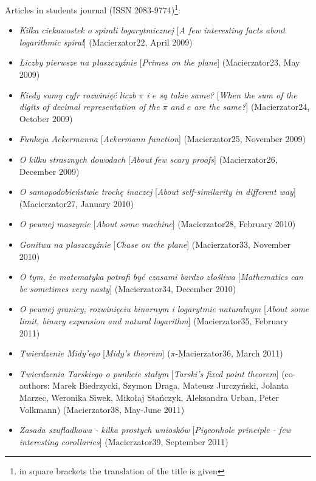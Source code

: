 \noindent Articles in students journal \macierzator (ISSN 2083-9774)\footnote{in square brackets the translation of the title is given}:
\begin{itemize}
  \item \textsl{Kilka ciekawostek o spirali logarytmicznej} [\textsl{A few interesting facts about logarithmic spiral}] (Macierzator22, April 2009)
  \item \textsl{Liczby pierwsze na płaszczyźnie} [\textsl{Primes on the plane}] (Macierzator23, May 2009)
  \item \textsl{Kiedy sumy cyfr rozwinięć liczb $\pi$ i $e$ są takie same?} [\textsl{When the sum of the digits of decimal representation of the $\pi$ and $e$ are the same?}] (Macierzator24, October 2009)
  \item \textsl{Funkcja Ackermanna} [\textsl{Ackermann function}] (Macierzator25, November 2009)
  \item \textsl{O kilku strasznych dowodach} [\textsl{About few scary proofs}] (Macierzator26, December 2009)
  \item \textsl{O samopodobieństwie  trochę inaczej} [\textsl{About self-similarity in different way}] \newline (Macierzator27, January 2010)
  \item \textsl{O pewnej maszynie} [\textsl{About some machine}] (Macierzator28, February 2010)
  \item \textsl{Gonitwa na płaszczyźnie} [\textsl{Chase on the plane}] (Macierzator33, November 2010)
  \item \textsl{O tym, że matematyka potrafi być czasami bardzo złośliwa} [\textsl{Mathematics can be sometimes very nasty}] (Macierzator34, December 2010)
  \item \textsl{O pewnej granicy, rozwinięciu binarnym i logarytmie naturalnym} [\textsl{About some limit, binary expansion and natural logarithm}] (Macierzator35, February 2011)
  \item \textsl{Twierdzenie Midy'ego} [\textsl{Midy's theorem}] ($\pi$-Macierzator36, March 2011)
  \item \textsl{Twierdzenia Tarskiego o punkcie stałym} [\textsl{Tarski's fixed point theorem}] (co-authors: Marek Biedrzycki, Szymon Draga, Mateusz Jurczyński, Jolanta Marzec, Weronika Siwek, Mikołaj Stańczyk, Aleksandra Urban, Peter Volkmann) (Macierzator38, May-June 2011)
  \item \textsl{Zasada szufladkowa - kilka prostych wniosków} [\textsl{Pigeonhole principle - few interesting corollaries}] (Macierzator39, September 2011)

\end{itemize}
